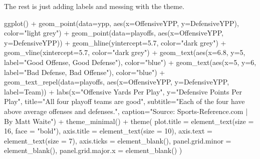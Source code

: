 \documentclass[
  letterpaper,
  DIV=11,
  numbers=noendperiod]{scrreprt}
\newenvironment{Shaded}{\begin{snugshade}}{\end{snugshade}}
\newcommand{\AttributeTok}[1]{\textcolor[rgb]{0.40,0.45,0.13}{#1}}
\newcommand{\DecValTok}[1]{\textcolor[rgb]{0.68,0.00,0.00}{#1}}
\newcommand{\FloatTok}[1]{\textcolor[rgb]{0.68,0.00,0.00}{#1}}
\newcommand{\FunctionTok}[1]{\textcolor[rgb]{0.28,0.35,0.67}{#1}}
\newcommand{\NormalTok}[1]{\textcolor[rgb]{0.00,0.23,0.31}{#1}}
\newcommand{\SpecialCharTok}[1]{\textcolor[rgb]{0.37,0.37,0.37}{#1}}
\newcommand{\StringTok}[1]{\textcolor[rgb]{0.13,0.47,0.30}{#1}}
\begin{document}
The rest is just adding labels and messing with the theme.

\begin{Shaded}
\begin{Highlighting}[]
\FunctionTok{ggplot}\NormalTok{() }\SpecialCharTok{+} 
  \FunctionTok{geom\_point}\NormalTok{(}\AttributeTok{data=}\NormalTok{ypp, }\FunctionTok{aes}\NormalTok{(}\AttributeTok{x=}\NormalTok{OffensiveYPP, }\AttributeTok{y=}\NormalTok{DefensiveYPP), }\AttributeTok{color=}\StringTok{"light grey"}\NormalTok{) }\SpecialCharTok{+}
  \FunctionTok{geom\_point}\NormalTok{(}\AttributeTok{data=}\NormalTok{playoffs, }\FunctionTok{aes}\NormalTok{(}\AttributeTok{x=}\NormalTok{OffensiveYPP, }\AttributeTok{y=}\NormalTok{DefensiveYPP)) }\SpecialCharTok{+}
  \FunctionTok{geom\_hline}\NormalTok{(}\AttributeTok{yintercept=}\FloatTok{5.7}\NormalTok{, }\AttributeTok{color=}\StringTok{"dark grey"}\NormalTok{) }\SpecialCharTok{+} 
  \FunctionTok{geom\_vline}\NormalTok{(}\AttributeTok{xintercept=}\FloatTok{5.7}\NormalTok{, }\AttributeTok{color=}\StringTok{"dark grey"}\NormalTok{) }\SpecialCharTok{+} 
  \FunctionTok{geom\_text}\NormalTok{(}\FunctionTok{aes}\NormalTok{(}\AttributeTok{x=}\FloatTok{6.8}\NormalTok{, }\AttributeTok{y=}\DecValTok{5}\NormalTok{, }\AttributeTok{label=}\StringTok{"Good Offense, Good Defense"}\NormalTok{), }\AttributeTok{color=}\StringTok{"blue"}\NormalTok{) }\SpecialCharTok{+}
  \FunctionTok{geom\_text}\NormalTok{(}\FunctionTok{aes}\NormalTok{(}\AttributeTok{x=}\DecValTok{5}\NormalTok{, }\AttributeTok{y=}\DecValTok{6}\NormalTok{, }\AttributeTok{label=}\StringTok{"Bad Defense, Bad Offense"}\NormalTok{), }\AttributeTok{color=}\StringTok{"blue"}\NormalTok{) }\SpecialCharTok{+}
  \FunctionTok{geom\_text\_repel}\NormalTok{(}\AttributeTok{data=}\NormalTok{playoffs, }\FunctionTok{aes}\NormalTok{(}\AttributeTok{x=}\NormalTok{OffensiveYPP, }\AttributeTok{y=}\NormalTok{DefensiveYPP, }\AttributeTok{label=}\NormalTok{Team)) }\SpecialCharTok{+}
  \FunctionTok{labs}\NormalTok{(}\AttributeTok{x=}\StringTok{"Offensive Yards Per Play"}\NormalTok{, }\AttributeTok{y=}\StringTok{"Defensive Points Per Play"}\NormalTok{, }\AttributeTok{title=}\StringTok{"All four playoff teams are good"}\NormalTok{, }\AttributeTok{subtitle=}\StringTok{"Each of the four have above average offenses and defenses."}\NormalTok{, }\AttributeTok{caption=}\StringTok{"Source: Sports{-}Reference.com | By Matt Waite"}\NormalTok{) }\SpecialCharTok{+}
  \FunctionTok{theme\_minimal}\NormalTok{() }\SpecialCharTok{+} 
  \FunctionTok{theme}\NormalTok{(}
    \AttributeTok{plot.title =} \FunctionTok{element\_text}\NormalTok{(}\AttributeTok{size =} \DecValTok{16}\NormalTok{, }\AttributeTok{face =} \StringTok{"bold"}\NormalTok{),}
    \AttributeTok{axis.title =} \FunctionTok{element\_text}\NormalTok{(}\AttributeTok{size =} \DecValTok{10}\NormalTok{),}
    \AttributeTok{axis.text =} \FunctionTok{element\_text}\NormalTok{(}\AttributeTok{size =} \DecValTok{7}\NormalTok{),}
    \AttributeTok{axis.ticks =} \FunctionTok{element\_blank}\NormalTok{(),}
    \AttributeTok{panel.grid.minor =} \FunctionTok{element\_blank}\NormalTok{(),}
    \AttributeTok{panel.grid.major.x =} \FunctionTok{element\_blank}\NormalTok{()}
\NormalTok{  )}
\end{Highlighting}
\end{Shaded}
\end{document}
